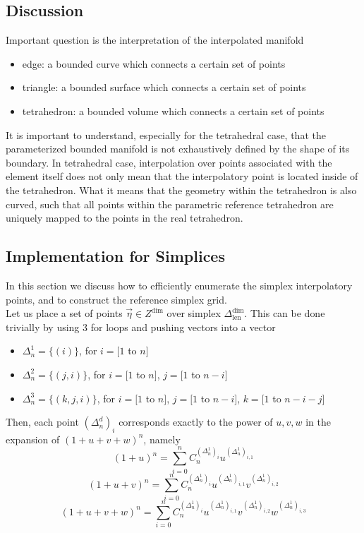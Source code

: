 \documentclass[12pt]{article}
\begin{document}
\subsection{Discussion}

\noindent
Important question is the interpretation of the interpolated manifold
\begin{itemize}
	\item edge: a bounded curve which connects a certain set of points
	\item triangle: a bounded surface which connects a certain set of points
	\item tetrahedron: a bounded volume which connects a certain set of points
\end{itemize}

\noindent
It is important to understand, especially for the tetrahedral case, that the parameterized bounded manifold is not exhaustively defined by the shape of its boundary. In tetrahedral case, interpolation over points associated with the element itself does not only mean that the interpolatory point is located inside of the tetrahedron. What it means that the geometry within the tetrahedron is also curved, such that all points within the parametric reference tetrahedron are uniquely mapped to the points in the real tetrahedron.


\subsection{Implementation for Simplices}
\label{subsection-simplexgrid}

\noindent
In this section we discuss how to efficiently enumerate the simplex interpolatory points, and to construct the reference simplex grid. \\

\noindent
Let us place a set of points $\vec{\eta} \in Z^{\dim}$ over simplex $\Delta^{\dim}_{\mathrm{len}}$. This can be done trivially
by using 3 for loops and pushing vectors into a vector
\begin{itemize}
	\item $\Delta^{1}_n = \{(i)\}$, for $i = [1$ to $n]$
	\item $\Delta^{2}_n = \{(j,i)\}$, for $i = [1$ to $n]$, $j = [1$ to $n - i]$
	\item $\Delta^{3}_n = \{(k,j,i)\}$, for $i = [1$ to $n]$, $j = [1$ to $n - i]$, $k = [1$ to $n - i - j]$
\end{itemize}

\noindent
Then, each point $(\Delta^{d}_n)_i$ corresponds exactly to the power of $u,v,w$ in the expansion of $(1 + u + v + w)^n$, namely
\[ (1 + u)^n = \sum_{i=0}^n C^{(\Delta^{1}_n)_i}_n u^{(\Delta^{1}_n)_{i,1}} \]
\[ (1 + u + v)^n = \sum_{i=0}^n C^{(\Delta^{1}_n)_i}_n u^{(\Delta^{1}_n)_{i,1}} v^{(\Delta^{1}_n)_{i,2}} \]
\[ (1 + u + v + w)^n = \sum_{i=0}^n C^{(\Delta^{1}_n)_i}_n u^{(\Delta^{1}_n)_{i,1}} v^{(\Delta^{1}_n)_{i,2}} w^{(\Delta^{1}_n)_{i,3}} \]
\end{document}
